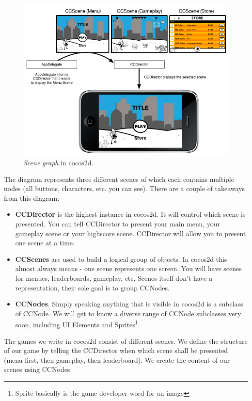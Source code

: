 \documentclass{scrreprt}
\newcommand{\cocos}{cocos2d}
\begin{document}
\begin{figure}[H]
		\includegraphics[width=400pt]{images/scenegraph.png}     
		\caption{\textit{Scene graph} in \cocos{}.}
\end{figure}
 
The diagram represents three different scenes of which each contains
multiple nodes (all buttons, characters, etc. you can see). There are a couple
of takeaways from this diagram:

\begin{itemize}
  \item \textbf{CCDirector} is the highest instance in \cocos{}. It will control
  which scene is presented. You can tell CCDirector to present your main menu,
  your gameplay scene or your highscore scene. CCDirector will allow you to
  present one scene at a time.
  \item \textbf{CCScenes} are used to build a logical group of objects. In
  \cocos{} this almost always means - one scene represents one screen. You will
  have scenes for menues, leaderboards, gameplay, etc. Scenes itself don't have
  a representation, their sole goal is to group CCNodes.
  \item \textbf{CCNodes}. Simply speaking anything that is visible in \cocos{}
  is a subclass of CCNode. We will get to know a diverse range of CCNode
  subclasses very soon, including UI Elements and Sprites\footnote{Sprite
  basically is the game developer word for an image}.
\end{itemize}

The games we write in \cocos{} consist of different scenes. We define the
structure of our game by telling the CCDirector when which scene shall be
presented (menu first, then gameplay, then leaderboard). We create the content
of our scenes using CCNodes.
\end{document}
